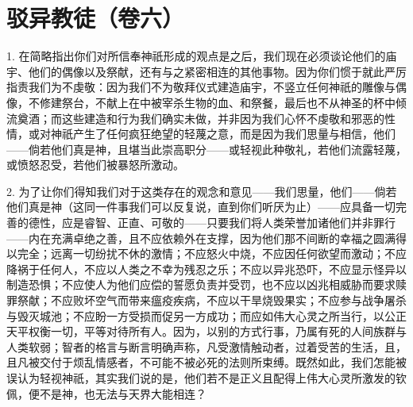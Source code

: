 

\section{驳异教徒（卷六）}

1. 在简略指出你们对所信奉神祇形成的观点是之后，我们现在必须谈论他们的庙宇、他们的偶像以及祭献，还有与之紧密相连的其他事物。因为你们惯于就此严厉指责我们为不虔敬：因为我们不为敬拜仪式建造庙宇，不竖立任何神祇的雕像与偶像，不修建祭台，不献上在中被宰杀生物的血、和祭餐，最后也不从神圣的杯中倾流奠酒；而这些建造和行为我们确实未做，并非因为我们心怀不虔敬和邪恶的性情，或对神祇产生了任何疯狂绝望的轻蔑之意，而是因为我们思量与相信，他们——倘若他们真是神，且堪当此崇高职分——或轻视此种敬礼，若他们流露轻蔑，或愤怒忍受，若他们被暴怒所激动。\par

2. 为了让你们得知我们对于这类存在的观念和意见——我们思量，他们——倘若他们真是神（这同一件事我们可以反复说，直到你们听厌为止）——应具备一切完善的德性，应是睿智、正直、可敬的——只要我们将人类荣誉加诸他们并非罪行——内在充满卓绝之善，且不应依赖外在支撑，因为他们那不间断的幸福之圆满得以完全；远离一切纷扰不休的激情；不应怒火中烧，不应因任何欲望而激动；不应降祸于任何人，不应以人类之不幸为残忍之乐；不应以异兆恐吓，不应显示怪异以制造恐惧；不应使人为他们应偿的誓愿负责并受罚，也不应以凶兆相威胁而要求赎罪祭献；不应败坏空气而带来瘟疫疾病，不应以干旱烧毁果实；不应参与战争屠杀与毁灭城池；不应盼一方受损而促另一方成功；而应如伟大心灵之所当行，以公正天平权衡一切，平等对待所有人。因为，以别的方式行事，乃属有死的人间族群与人类软弱；智者的格言与断言明确声称，凡受激情触动者，过着受苦的生活，且，且凡被交付于烦乱情感者，不可能不被必死的法则所束缚。既然如此，我们怎能被误认为轻视神祇，其实我们说的是，他们若不是正义且配得上伟大心灵所激发的钦佩，便不是神，也无法与天界大能相连？\par

